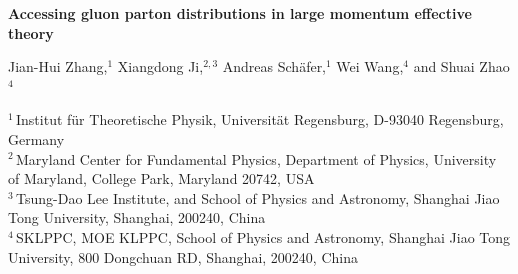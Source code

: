 \documentclass[11pt]{article}
\begin{document}
\begin{center}
  {\Large\bfseries Accessing gluon parton distributions in large momentum effective theory\par}
  \vspace{1.4em}
  {\normalsize
   Jian-Hui Zhang,$^{1}$\;
   Xiangdong Ji,$^{2,3}$\;
   Andreas Sch\"afer,$^{1}$\;
   Wei Wang,$^{4}$\;
   and Shuai Zhao$^{4}$\par}
  \vspace{0.9em}
  {\small
   $^{1}$\,Institut f\"ur Theoretische Physik, Universit\"at Regensburg, D-93040 Regensburg, Germany\\[2pt]
   $^{2}$\,Maryland Center for Fundamental Physics, Department of Physics, University of Maryland,
   College Park, Maryland 20742, USA\\[2pt]
   $^{3}$\,Tsung-Dao Lee Institute, and School of Physics and Astronomy,
   Shanghai Jiao Tong University, Shanghai, 200240, China\\[2pt]
   $^{4}$\,SKLPPC, MOE KLPPC, School of Physics and Astronomy, Shanghai Jiao Tong University,
   800 Dongchuan RD, Shanghai, 200240, China\par}
\end{center}

\vspace{0.4em}

\begin{abstract}
Gluon parton distribution functions (PDFs) in the proton can be calculated directly on Euclidean lattices using large
momentum effective theory (LaMET). To realize this goal, one has to find renormalized gluon quasi-PDFs in which
power divergences and operator mixing are thoroughly understood. For the unpolarized distribution,
we identify four independent quasi-PDF correlators that can be multiplicatively renormalized
on the lattice. Similarly, the helicity distribution can be derived from three independent multiplicatively renormalizable
quasi-PDFs. We provide a LaMET factorization formula for these renormalized quasi-PDFs from which one can extract the gluon PDFs.
\end{abstract}









\end{document}
